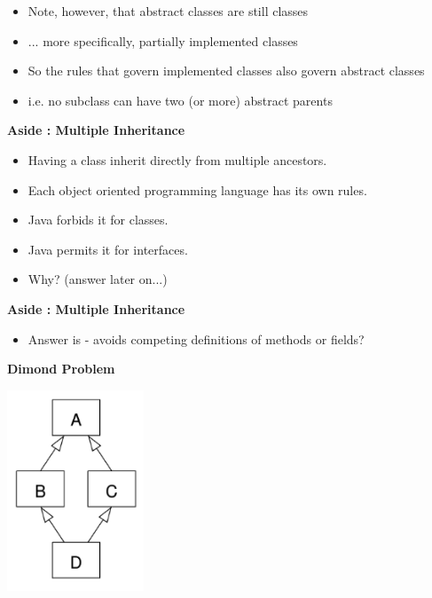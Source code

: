 \documentclass{beamer}
\begin{document}
\begin{frame}
\begin{itemize}
\item Note, however, that abstract classes are still classes
\item ... more specifically, partially implemented classes
\bigskip
\item So the rules that govern implemented classes also govern abstract classes 
\item i.e. no subclass can have two (or more) abstract parents
\end{itemize}
\end{frame}

\begin{frame}
\begin{center}
\textbf{Aside : Multiple Inheritance}
\end{center}
\begin{itemize}
\item Having a class inherit directly from multiple ancestors.
\item Each object oriented programming language has its own rules.
\item Java forbids it for classes.
\item Java permits it for interfaces.
\bigskip
\item Why? (answer later on...)
\end{itemize}
\end{frame}

\begin{frame}
\begin{center}
\textbf{Aside : Multiple Inheritance}
\end{center}
\begin{itemize}
\item Answer is - avoids competing definitions of methods or fields?
\end{itemize}
\end{frame}

\begin{frame}
\begin{center}
\textbf{Dimond Problem}
\end{center}
\begin{center}
\includegraphics[height=6cm, keepaspectratio]{images/diamond}
\end{center}
\end{frame}
\end{document}
